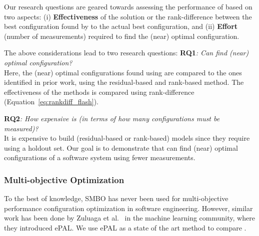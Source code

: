 Our research questions are geared towards assessing the performance of \flash based on two aspects: (i) \textbf{Effectiveness} of the solution or the rank-difference between the best configuration found by \flash to the actual best configuration, and (ii) \textbf{Effort} (number of measurements) required to find the (near) optimal configuration.

\noindent The above considerations lead to two research questions:
\noindent\textbf{RQ1}\textit{: Can  \flash find (near) optimal configuration?}\\
Here, the (near) optimal configurations found using \flash are compared to the ones identified in prior work, using the residual-based and rank-based method. The effectiveness of the methods is compared using rank-difference (Equation~\ref{eq:rankdiff_flash}). 


\noindent\textbf{RQ2}\textit{: How expensive is \flash (in terms of
 how many configurations must be measured)?}\\
It is expensive to build (residual-based or rank-based) models since they require using a holdout set. Our goal is to  demonstrate that \flash can find (near) optimal configurations of a software system using fewer measurements.

\subsubsection{Multi-objective Optimization}
To the best of knowledge, SMBO has never been used for multi-objective performance configuration optimization in software engineering. However, similar work has been done by Zuluaga et al.~\cite{zuluaga2016varepsilon} in the machine learning community, where they introduced ePAL. We use ePAL as a state of the art method to compare \flash.

